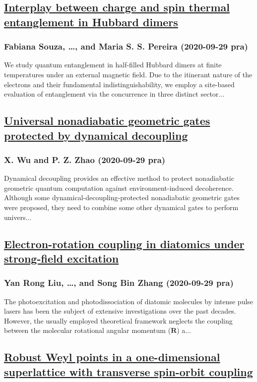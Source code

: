 \subsection*{\href{http://link.aps.org/doi/10.1103/PhysRevA.102.032421}{Interplay between charge and spin thermal entanglement in Hubbard dimers}}
\subsubsection*{Fabiana Souza, \dots, and Maria S. S. Pereira (2020-09-29 pra)}
We study quantum entanglement in half-filled Hubbard dimers at finite temperatures under an external magnetic field. Due to the itinerant nature of the electrons and their fundamental indistinguishability, we employ a site-based evaluation of entanglement via the concurrence in three distinct sector...
\subsection*{\href{http://link.aps.org/doi/10.1103/PhysRevA.102.032627}{Universal nonadiabatic geometric gates protected by dynamical decoupling}}
\subsubsection*{X. Wu and P. Z. Zhao (2020-09-29 pra)}
Dynamical decoupling provides an effective method to protect nonadiabatic geometric quantum computation against environment-induced decoherence. Although some dynamical-decoupling-protected nonadiabatic geometric gates were proposed, they need to combine some other dynamical gates to perform univers...
\subsection*{\href{http://link.aps.org/doi/10.1103/PhysRevA.102.033114}{Electron-rotation coupling in diatomics under strong-field excitation}}
\subsubsection*{Yan Rong Liu, \dots, and Song Bin Zhang (2020-09-29 pra)}
The photoexcitation and photodissociation of diatomic molecules by intense pulse lasers has been the subject of extensive investigations over the past decades. However, the usually employed theoretical framework neglects the coupling between the molecular rotational angular momentum ($\mathbf{R}$) a...
\subsection*{\href{http://link.aps.org/doi/10.1103/PhysRevA.102.033339}{Robust Weyl points in a one-dimensional superlattice with transverse spin-orbit coupling}}
